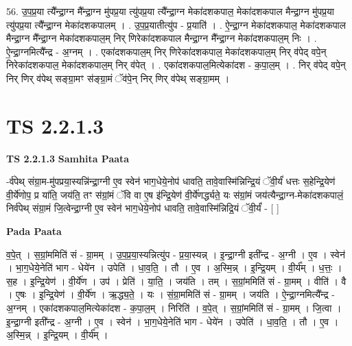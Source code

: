 \documentclass[17pt]{extarticle}
\begin{document}
56. उ॒प॒प्र॒या त्यै᳚न्द्रा॒ग्न मै᳚न्द्रा॒ग्न मु॑पप्र॒या त्यु॑पप्र॒या त्यै᳚न्द्रा॒ग्न मेका॑दशकपाल॒ मेका॑दशकपाल मैन्द्रा॒ग्न मु॑पप्र॒या त्यु॑पप्र॒या त्यै᳚न्द्रा॒ग्न मेका॑दशकपालम् । . उ॒प॒प्र॒यातीत्यु॑प - प्र॒याति॑ । . ऐ॒न्द्रा॒ग्न मेका॑दशकपाल॒ मेका॑दशकपाल मैन्द्रा॒ग्न मै᳚न्द्रा॒ग्न मेका॑दशकपाल॒म् निर् णिरेका॑दशकपाल मैन्द्रा॒ग्न मै᳚न्द्रा॒ग्न मेका॑दशकपाल॒म् निः । . ऐ॒न्द्रा॒ग्नमित्यै᳚न्द्र - अ॒ग्नम् । . एका॑दशकपाल॒म् निर् णिरेका॑दशकपाल॒ मेका॑दशकपाल॒म् निर् व॑पेद् वपे॒न् निरेका॑दशकपाल॒ मेका॑दशकपाल॒म् निर् व॑पेत् । . एका॑दशकपाल॒मित्येका॑दश - क॒पा॒ल॒म् । . निर् व॑पेद् वपे॒न् निर् णिर् व॑पेथ् सङ्ग्रा॒मꣳ स॑ङ्ग्रा॒मं ॅव॑पे॒न् निर् णिर् व॑पेथ् सङ्ग्रा॒मम् । \newline
\pagebreak
{}
\section*{ TS 2.2.1.3 }

\textbf{TS 2.2.1.3 } \newline
\textbf{Samhita Paata} \newline

-र्व॑पेथ् संग्रा॒म-मु॑पप्रया॒स्यन्नि॑न्द्रा॒ग्नी ए॒व स्वेन॑ भाग॒धेये॒नोप॑ धावति॒ तावे॒वास्मि॑न्निन्द्रि॒यं ॅवी॒र्यं॑ धत्तः स॒हेन्द्रि॒येण॑ वी॒र्ये॑णोप॒ प्र या॑ति॒ जय॑ति॒ तꣳ स॑ग्रां॒मं ॅवि वा ए॒ष इ॑न्द्रि॒येण॑ वी॒र्ये॑णर्द्ध्यते॒ यः स॑ग्रां॒मं जय॑त्यैन्द्रा॒ग्न-मेका॑दशकपालं॒ निर्व॑पेथ् संग्रा॒मं जि॒त्वेन्द्रा॒ग्नी ए॒व स्वेन॑ भाग॒धेये॒नोप॑ धावति॒ तावे॒वास्मि॑न्निद्रि॒यं ॅवी॒र्यं॑ - [  ] \newline

\textbf{Pada Paata} \newline

व॒पे॒त् । स॒ग्रां॒ममिति॑ सं - ग्रा॒मम् । उ॒प॒प्र॒या॒स्यन्नित्यु॑प - प्र॒या॒स्यन्न् । इ॒न्द्रा॒ग्नी इती᳚न्द्र - अ॒ग्नी । ए॒व । स्वेन॑ । भा॒ग॒धेये॒नेति॑ भाग - धेये॑न । उपेति॑ । धा॒व॒ति॒ । तौ । ए॒व । अ॒स्मि॒न्न् । इ॒न्द्रि॒यम् । वी॒र्य᳚म् । ध॒त्तः॒ । स॒ह । इ॒न्द्रि॒येण॑ । वी॒र्ये॑ण । उप॑ । प्रेति॑ । या॒ति॒ । जय॑ति । तम् । स॒ग्रां॒ममिति॑ सं - ग्रा॒मम् । वीति॑ । वै । ए॒षः । इ॒न्द्रि॒येण॑ । वी॒र्ये॑ण । ऋ॒द्ध्य॒ते॒ । यः । सं॒ग्रा॒ममिति॑ सं - ग्रा॒मम् । जय॑ति । ऐ॒न्द्रा॒ग्नमित्यै᳚न्द्र - अ॒ग्नम् । एका॑दशकपाल॒मित्येका॑दश - क॒पा॒ल॒म् । निरिति॑ । व॒पे॒त् । स॒ग्रां॒ममिति॑ सं - ग्रा॒मम् । जि॒त्वा । इ॒न्द्रा॒ग्नी इती᳚न्द्र - अ॒ग्नी । ए॒व । स्वेन॑ । भा॒ग॒धेये॒नेति॑ भाग - धेये॑न । उपेति॑ । धा॒व॒ति॒ । तौ । ए॒व । अ॒स्मि॒न्न् । इ॒न्द्रि॒यम् । वी॒र्य᳚म् ।  \newline
\end{document}
